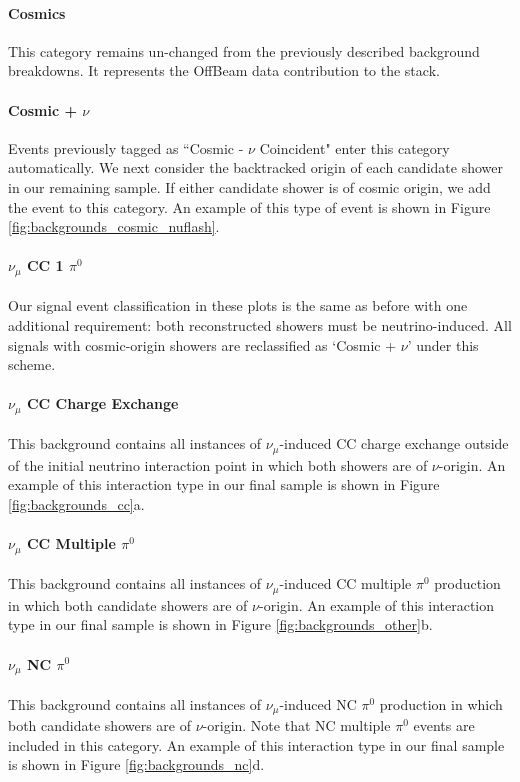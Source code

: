 \paragraph{ Cosmics}
This category remains un-changed from the previously described background breakdowns.  It represents the OffBeam data contribution to the stack. 

\paragraph{ Cosmic + $\nu$}
Events previously tagged as ``Cosmic - $\nu$ Coincident" enter this category automatically.  We next consider the backtracked origin of each candidate shower in our remaining sample.  If either candidate shower is of cosmic origin, we add the event to this category. An example of this type of event is shown in Figure \ref{fig:backgrounds_cosmic_nuflash}.

\paragraph{ $\nu_\mu$ CC 1 $\pi^0$ } Our signal event classification in these plots is the same as before with one additional requirement: both reconstructed showers must be neutrino-induced.  All signals with cosmic-origin showers are reclassified as `Cosmic + $\nu$' under this scheme.

\paragraph{$\nu_\mu$ CC Charge Exchange}
This background contains all instances of $\nu_\mu$-induced CC charge exchange outside of the initial neutrino interaction point in which both showers are of $\nu$-origin. An example of this interaction type in our final sample is shown in Figure \ref{fig:backgrounds_cc}a. 

\paragraph{$\nu_\mu$ CC Multiple $\pi^0$}
This background contains all instances of $\nu_\mu$-induced CC multiple $\pi^0$ production in which both candidate showers are of $\nu$-origin.  An example of this interaction type in our final sample is shown in Figure \ref{fig:backgrounds_other}b.

\paragraph{$\nu_\mu$ NC $\pi^0$}
This background contains all instances of $\nu_\mu$-induced NC $\pi^0$ production in which both candidate showers are of $\nu$-origin. Note that NC multiple $\pi^0$ events are included in this category.  An example of this interaction type in our final sample is shown in Figure \ref{fig:backgrounds_nc}d. 

